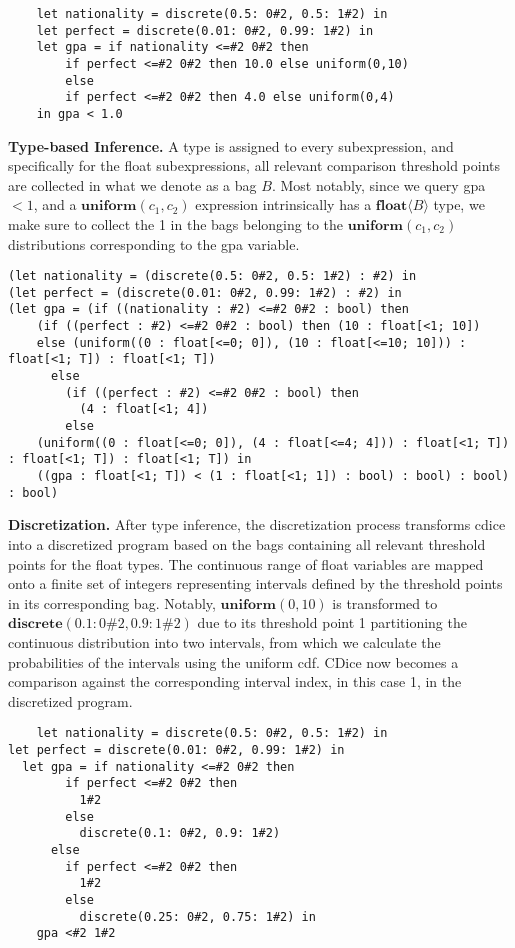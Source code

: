 \documentclass[nonacm,anonymous]{acmart}
\begin{document}
\begin{lstlisting}
    let nationality = discrete(0.5: 0#2, 0.5: 1#2) in
    let perfect = discrete(0.01: 0#2, 0.99: 1#2) in
    let gpa = if nationality <=#2 0#2 then 
        if perfect <=#2 0#2 then 10.0 else uniform(0,10)
        else
        if perfect <=#2 0#2 then 4.0 else uniform(0,4) 
    in gpa < 1.0
\end{lstlisting}


\textbf{Type-based Inference.} A type is assigned to every subexpression, and specifically for the float subexpressions, all relevant comparison threshold points are collected in what we denote as a bag $B$. Most notably, since we query gpa $< 1$, and a $\textbf{uniform}(c_1,c_2)$ expression intrinsically has a $\textbf{float}\langle B \rangle$ type, we make sure to collect the 1 in the bags belonging to the $\textbf{uniform}(c_1,c_2)$ distributions corresponding to the gpa variable.

\begin{lstlisting}
(let nationality = (discrete(0.5: 0#2, 0.5: 1#2) : #2) in
(let perfect = (discrete(0.01: 0#2, 0.99: 1#2) : #2) in
(let gpa = (if ((nationality : #2) <=#2 0#2 : bool) then
    (if ((perfect : #2) <=#2 0#2 : bool) then (10 : float[<1; 10])
    else (uniform((0 : float[<=0; 0]), (10 : float[<=10; 10])) : float[<1; T]) : float[<1; T])
      else
        (if ((perfect : #2) <=#2 0#2 : bool) then
          (4 : float[<1; 4])
        else
    (uniform((0 : float[<=0; 0]), (4 : float[<=4; 4])) : float[<1; T]) : float[<1; T]) : float[<1; T]) in
    ((gpa : float[<1; T]) < (1 : float[<1; 1]) : bool) : bool) : bool) : bool)
\end{lstlisting}


\textbf{Discretization.} After type inference, the discretization process transforms cdice into a discretized program based on the bags containing all relevant threshold points for the float types. The continuous range of float variables are mapped onto a finite set of integers representing intervals defined by the threshold points in its corresponding bag. Notably, $\textbf{uniform}(0,10)$ is transformed to $\textbf{discrete}(0.1: 0\#2, 0.9: 1\#2)$ due to its threshold point 1 partitioning the continuous distribution into two intervals, from which we calculate the probabilities of the intervals using the uniform cdf. CDice now becomes a comparison against the corresponding interval index, in this case 1, in the discretized program.

\begin{lstlisting}
    let nationality = discrete(0.5: 0#2, 0.5: 1#2) in
let perfect = discrete(0.01: 0#2, 0.99: 1#2) in
  let gpa = if nationality <=#2 0#2 then
        if perfect <=#2 0#2 then
          1#2
        else
          discrete(0.1: 0#2, 0.9: 1#2)
      else
        if perfect <=#2 0#2 then
          1#2
        else
          discrete(0.25: 0#2, 0.75: 1#2) in
    gpa <#2 1#2
\end{lstlisting}
\end{document}
